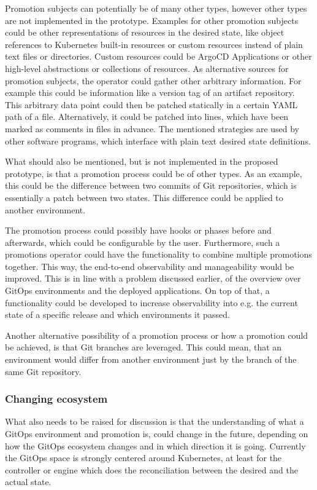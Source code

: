 Promotion subjects can potentially be of many other types, however other types are not implemented in the prototype.
Examples for other promotion subjects could be other representations of resources in the desired state,
like object references to Kubernetes built-in resources or custom resources instead of plain text files or directories.
Custom resources could be ArgoCD Applications or other high-level abstractions or collections of resources.
As alternative sources for promotion subjects,
the operator could gather other arbitrary information. For example this could be information like a version tag
of an artifact repository.
This arbitrary data point could then be patched statically in a certain YAML path of a file.
Alternatively, it could be patched into lines, which have been marked as comments in files in advance.
The mentioned strategies are used by other software programs, which interface with plain text desired state definitions.

What should also be mentioned, but is not implemented in the proposed prototype,
is that a promotion process could be of other types.
As an example, this could be the difference between two commits of Git repositories,
which is essentially a patch between two states. This difference could be applied to another environment.

The promotion process could possibly have hooks or phases before and afterwards, which could be configurable by the user.
Furthermore, such a promotions operator could have the functionality to combine multiple promotions together.
This way, the end-to-end observability and manageability would be improved.
This is in line with a problem discussed earlier, of the overview over GitOps environments
and the deployed applications. On top of that, a functionality could be developed
to increase observability into e.g. the current state of a specific release and which environments it passed.

Another alternative possibility of a promotion process or how a promotion could be achieved,
is that Git branches are leveraged.
This could mean, that an environment would differ from another environment just by the branch of the same Git repository.

\subsubsection*{Changing ecosystem}

What also needs to be raised for discussion is that
the understanding of what a GitOps environment and promotion is,
could change in the future, depending on how the GitOps ecosystem changes
and in which direction it is going. Currently the GitOps space
is strongly centered around Kubernetes, at least for the controller or engine which does the reconciliation
between the desired and the actual state.

